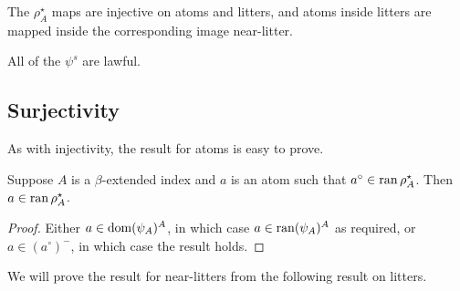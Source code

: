 \begin{corollary}
    The \( \rho^\star_A \) maps are injective on atoms and litters, and atoms inside litters are mapped inside the corresponding image near-litter.
\end{corollary}
\begin{corollary}
    All of the \( \psi^s \) are lawful.
\end{corollary}

\subsection{Surjectivity}

As with injectivity, the result for atoms is easy to prove.

\begin{lemma}
    Suppose \( A \) is a \( \beta \)-extended index and \( a \) is an atom such that \( a^\circ \in \operatorname{ran} \rho^\star_A \).
    Then \( a \in \operatorname{ran} \rho^\star_A \).
\end{lemma}
\begin{proof}
    Either \( a \in \operatorname{dom} (\psi_A)^A \), in which case \( a \in \operatorname{ran} (\psi_A)^A \) as required, or \( a \in (a^\circ)^- \), in which case the result holds.
\end{proof}

We will prove the result for near-litters from the following result on litters.

